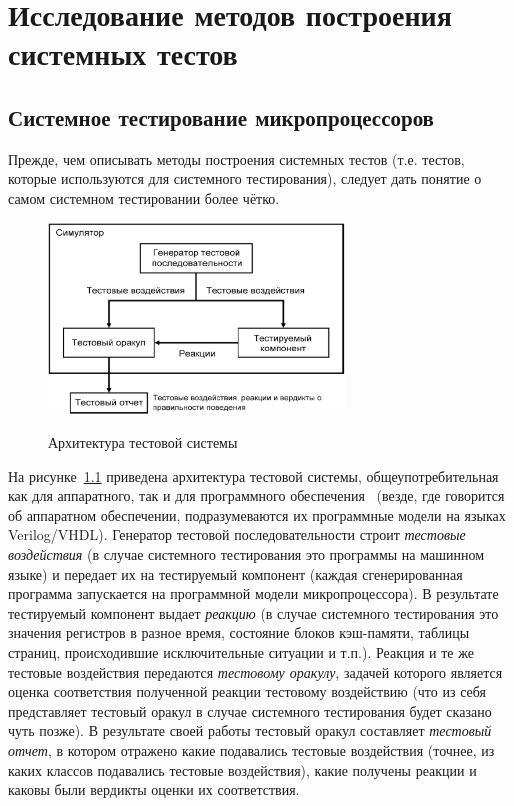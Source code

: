 \chapter{Исследование методов построения системных тестов}

\section{Системное тестирование микропроцессоров}

Прежде, чем описывать методы построения системных тестов (т.е. тестов, которые используются для системного тестирования), следует дать понятие о самом системном тестировании более чётко.
\begin{figure}[h] \center
  \includegraphics[width=0.7\textwidth]{1.review/test-system}\\
  \caption{Архитектура тестовой системы}\label{fig:test_system}
\end{figure}

На рисунке~\ref{fig:test_system} приведена архитектура тестовой системы, общеупотребительная как для аппаратного, так и для программного обеспечения~\cite{IvanPreprint} (везде, где говорится об аппаратном обеспечении, подразумеваются их программные модели на языках Verilog/VHDL). Генератор тестовой последовательности строит \emph{тестовые воздействия} (в случае системного тестирования это программы на машинном языке) и передает их на тестируемый компонент (каждая сгенерированная программа запускается на программной модели микропроцессора). В результате тестируемый компонент выдает \emph{реакцию} (в случае системного тестирования это значения регистров в разное время, состояние блоков кэш-памяти, таблицы страниц, происходившие исключительные ситуации и т.п.). Реакция и те же тестовые воздействия передаются \emph{тестовому оракулу}, задачей которого является оценка соответствия полученной реакции тестовому воздействию (что из себя представляет тестовый оракул в случае системного тестирования будет сказано чуть позже). В результате своей работы тестовый оракул составляет \emph{тестовый отчет}, в котором отражено какие подавались тестовые воздействия (точнее, из каких классов подавались тестовые воздействия), какие получены реакции и каковы были вердикты оценки их соответствия.

